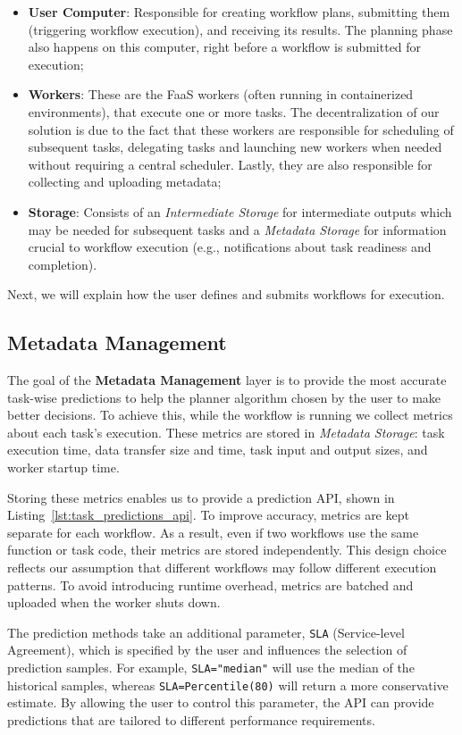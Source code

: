 \documentclass[conference]{IEEEtran}
\begin{document}
\begin{itemize}
    \item \textbf{User Computer}: Responsible for creating workflow plans, submitting them (triggering workflow execution), and receiving its results. The planning phase also happens on this computer, right before a workflow is submitted for execution;
    \item \textbf{Workers}: These are the FaaS workers (often running in containerized environments), that execute one or more tasks. The decentralization of our solution is due to the fact that these workers are responsible for scheduling of subsequent tasks, delegating tasks and launching new workers when needed without requiring a central scheduler. Lastly, they are also responsible for collecting and uploading metadata;
    \item \textbf{Storage}: Consists of an \textit{Intermediate Storage} for intermediate outputs which may be needed for subsequent tasks and a \textit{Metadata Storage} for information crucial to workflow execution (e.g., notifications about task readiness and completion).
\end{itemize}

Next, we will explain how the user defines and submits workflows for execution.

\subsection{Metadata Management}
\label{ss:metadata_management}
The goal of the \textbf{Metadata Management} layer is to provide the most accurate task-wise predictions to help the planner algorithm chosen by the user to make better decisions. To achieve this, while the workflow is running we collect metrics about each task's execution. These metrics are stored in \textit{Metadata Storage}: task execution time, data transfer size and time, task input and output sizes, and worker startup time. 

Storing these metrics enables us to provide a prediction API, shown in Listing~\ref{lst:task_predictions_api}. To improve accuracy, metrics are kept separate for each workflow. As a result, even if two workflows use the same function or task code, their metrics are stored independently. This design choice reflects our assumption that different workflows may follow different execution patterns. To avoid introducing runtime overhead, metrics are batched and uploaded when the worker shuts down.

The prediction methods take an additional parameter, \texttt{SLA} (Service-level Agreement), which is specified by the user and influences the selection of prediction samples. For example, \texttt{SLA="median"} will use the median of the historical samples, whereas \texttt{SLA=Percentile(80)} will return a more conservative estimate. By allowing the user to control this parameter, the API can provide predictions that are tailored to different performance requirements.
\end{document}

